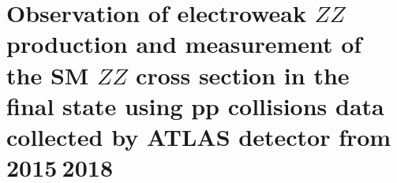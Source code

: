 \chapter{Observation of electroweak $ZZ$ production and measurement of the SM $ZZ$ cross section in the \llll final state using pp collisions data collected by ATLAS detector from 2015$~$2018}










\clearpage

